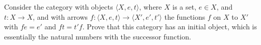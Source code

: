 Consider the category with objects $\langle X, e, t\rangle$, where $X$ is a set, $e \in X$, and $t: X \rightarrow X$, and with arrows $f: \langle X, e, t\rangle \rightarrow \langle X', e', t'\rangle$ the functions $f$ on $X$ to $X'$ with $fe = e'$ and $ft = t'f$. Prove that this category has an initial object, which is essentially the natural numbers with the successor function.
